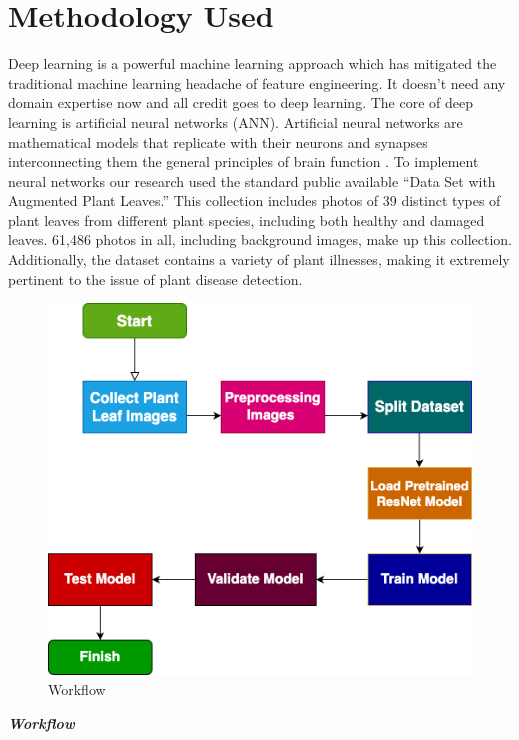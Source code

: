 \documentclass[conference]{IEEEtran}
\begin{document}
\section{\textbf{Methodology Used}}
Deep learning is a powerful machine learning approach which has mitigated the traditional machine learning headache of feature
engineering. It doesn’t need any domain expertise now and all credit goes to deep learning. The core of deep learning is artificial neural networks (ANN). Artificial neural networks are mathematical models that replicate with their neurons and synapses interconnecting them the general principles of brain function . To implement neural networks our research used the standard public available “Data Set with
Augmented Plant Leaves.” This collection includes photos of 39 distinct types of plant leaves from different plant species, including both healthy and damaged leaves. 61,486 photos in all, including background images, make up this collection. Additionally, the dataset contains a variety of plant illnesses, making it extremely pertinent to the issue of plant disease detection.
\begin{figure}
    \centering
    \includegraphics[width=1\linewidth]{workflow.drawio.drawio.png}
    \caption{Workflow}
    
    \label{fig:enter-label}
\end{figure}

\textit{\textbf{Workflow}}
\end{document}
